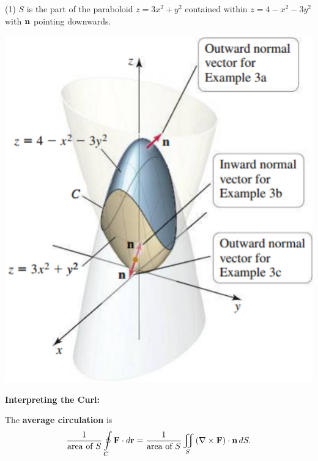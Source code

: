 \documentclass[mathNotesPreamble]{subfiles}
\begin{document}
  \begin{tasks}[after-item-skip=\stretch{1}, label=\textbullet, item-indent=0pt, resume](1)
    \task $S$ is the part of the paraboloid $z=3x^2+y^2$ contained within $z=4-x^2-3y^2$ with ${\mathbf{n}}$ pointing downwards.
  \end{tasks}
  \begin{flushright}
    \includegraphics[width=0.35\linewidth]{images/briggs_17_07/fig17_63}
  \end{flushright}
  \pagebreak

  \textbf{Interpreting the Curl:}

  The \textbf{average circulation} is 
    \[\frac{1}{\textnormal{area of }S}\oint\limits_C \mathbf F\cdot d{\mathbf{r}}=\frac{1}{\textnormal{area of }S}\iint\limits_S {\left(\nabla\times\mathbf F\right)}\cdot{\mathbf{n}}\,dS.\]
\end{document}

